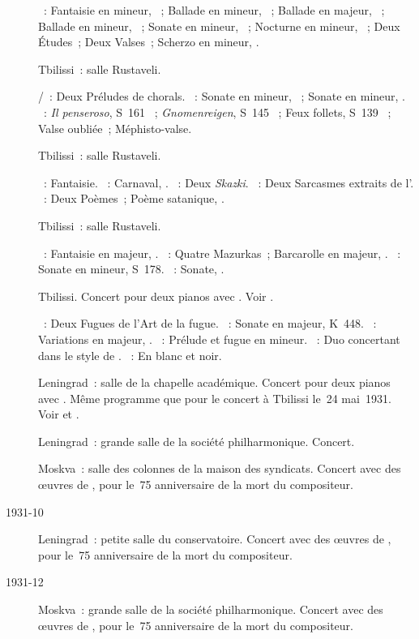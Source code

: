 \begin{description}
 \textsc{\Chopin{}}~: Fantaisie en \kF mineur, ~; Ballade en \kF
 mineur, ~; Ballade en \kA \Flat majeur, ~; Ballade en \kG
 mineur, ~; Sonate en \kB \Flat mineur, ~; Nocturne en \kF
 mineur,  ~; Deux Études~; Deux Valses~; Scherzo en \kB
 mineur, .
 \item[\DateWithWeekDay{1931-05-16}]
 Tbilissi~: salle Rustaveli.

 \textsc{\JBach{}/\Busoni{}}~: Deux Préludes de chorals.
 \textsc{\Beethoven{}}~: Sonate en \kC mineur, ~; Sonate en \kC
 \Sharp mineur,  .
 \textsc{\Liszt{}}~: \emph{Il penseroso}, S~161 ~;
 \emph{Gnomenreigen}, S~145 ~; Feux follets, S~139 ~;
 Valse oubliée~; Méphisto-valse.
 \item[\DateWithWeekDay{1931-05-21}]
 Tbilissi~: salle Rustaveli.

 \textsc{\Mozart{}}~: Fantaisie.
 \textsc{\Schumann{}}~: Carnaval, .
 \textsc{\Medtner{}}~: Deux \emph{Skazki}.
 \textsc{\Prokofiev{}}~: Deux Sarcasmes extraits de l'.
 \textsc{\Scriabine{}}~: Deux Poèmes~; Poème satanique, .
 \item[\DateWithWeekDay{1931-05-22}]
 Tbilissi~: salle Rustaveli.

 \textsc{\Schumann{}}~: Fantaisie en \kC majeur, .
 \textsc{\Chopin{}}~: Quatre Mazurkas~; Barcarolle en \kF \Sharp majeur,
 .
 \textsc{\Liszt{}}~: Sonate en \kB mineur, S~178.
 \textsc{\Scriabine{}}~: Sonate, .
 \item[\DateWithWeekDay{1931-05-24}]
 Tbilissi.
 Concert pour deux pianos avec \MYudina{}.
 Voir \citet{Yudina02}.

 \textsc{\JBach{}}~: Deux Fugues de l'\hbox{Art} de la fugue.
 \textsc{\Mozart{}}~: Sonate en \kD majeur, K~448.
 \textsc{\Schumann{}}~: Variations en \kB \Flat majeur, .
 \textsc{\Taneiev{}}~: Prélude et fugue en \kG \Sharp mineur.
 \textsc{\Busoni{}}~: Duo concertant dans le style de \Mozart{}.
 \textsc{\Debussy{}}~: En blanc et noir.
 \item[\DateWithWeekDay{1931-06-20}]
 Leningrad~: salle de la chapelle académique.
 Concert pour deux pianos avec \MYudina{}.
 Même programme que pour le concert à Tbilissi le~24 mai~1931.
 Voir \citet[p.~46 et note~4]{White} et \citet[p.~403]{Scriabine}.
 \item[\DateWithWeekDay{1931-10-08}]
 Leningrad~: grande salle de la société philharmonique.
 Concert.
 \item[\DateWithWeekDay{1931-10-11}]
 Moskva~: salle des colonnes de la maison des syndicats.
 Concert avec des œuvres de \Schumann{}, pour le~75\ieme{} anniversaire de
 la mort du compositeur.
 \item[1931-10]
 Leningrad~: petite salle du conservatoire.
 Concert avec des œuvres de \Schumann{}, pour le~75\ieme{} anniversaire de
 la mort du compositeur.
 \item[1931-12]
 Moskva~: grande salle de la société philharmonique.
 Concert avec des œuvres de \Schumann{}, pour le~75\ieme{} anniversaire de
 la mort du compositeur.


\end{description}
